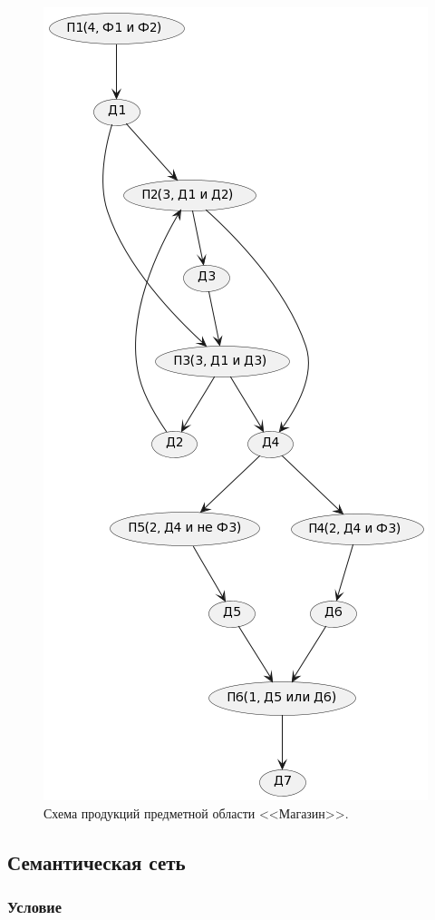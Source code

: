 \documentclass[14pt, a4paper, titlepage]{extarticle}
\begin{document}
\begin{figure}[H]
	\includegraphics[scale=.8]{pic1}
	\caption{Схема продукций предметной области <<Магазин>>.}
\end{figure}

\subsection{Семантическая сеть}

\subsubsection*{Условие}
\end{document}
